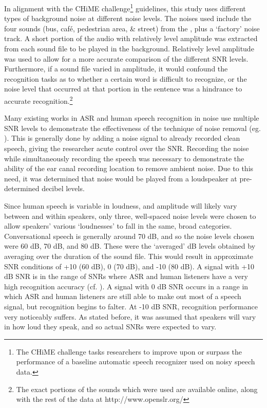 In alignment with the CHiME challenge\footnote{The CHiME challenge tasks researchers to improve upon or surpass the performance of a baseline automatic speech recognizer used on noisy speech data.} guidelines, this study uses different types of background noise at different noise levels.  The noises used include the four sounds (bus, caf\'{e}, pedestrian area, \& street) from the \cite{chime:16}, plus a `factory' noise track.  A short portion of the audio with relatively level amplitude was extracted from each sound file to be played in the background.  Relatively level amplitude was used to allow for a more accurate comparison of the different SNR levels. Furthermore, if a sound file varied in amplitude, it would confound the recognition tasks as to whether a certain word is difficult to recognize, or the noise level that occurred at that portion in the sentence was a hindrance to accurate recognition.\footnote{The exact portions of the sounds which were used are available online, along with the rest of the data at http://www.openslr.org/}

Many existing works in ASR and human speech recognition in noise use multiple SNR levels to demonstrate the effectiveness of the technique of noise removal (eg. \cite{braun:16}).  This is generally done by adding a noise signal to already recorded clean speech, giving the researcher acute control over the SNR.  Recording the noise while simultaneously recording the speech was necessary to demonstrate the ability of the ear canal recording location to remove ambient noise.  Due to this need, it was determined that noise would be played from a loudspeaker at pre-determined decibel levels.  

Since human speech is variable in loudness, and amplitude will likely vary between and within speakers, only three, well-spaced noise levels were chosen to allow speakers' various `loudnesses' to fall in the same, broad categories.  Conversational speech is generally around 70 dB, and so the noise levels chosen were 60 dB, 70 dB, and 80 dB.  These were the `averaged' dB levels obtained by averaging over the duration of the sound file.  This would result in approximate SNR conditions of +10 (60 dB), 0 (70 dB), and -10 (80 dB).  A signal with +10 dB SNR is in the range of SNRs where ASR and human listeners have a very high recognition accuracy (cf. \cite{braun:16,gilbert:13}).  A signal with 0 dB SNR occurs in a range in which ASR and human listeners are still able to make out most of a speech signal, but recognition begins to falter.  At -10 dB SNR, recognition performance very noticeably suffers.  As stated before, it was assumed that speakers will vary in how loud they speak, and so actual SNRs were expected to vary.

